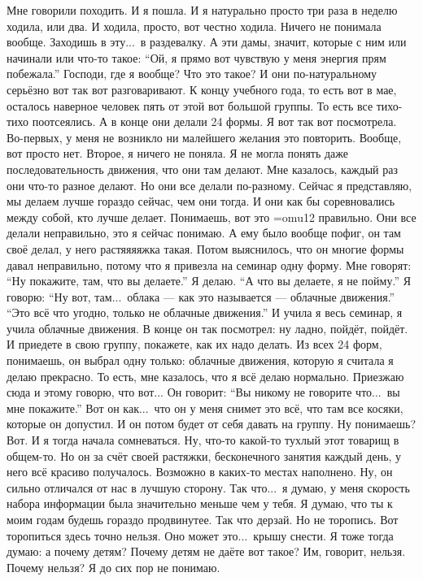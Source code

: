 Мне говорили походить.
И я пошла.
И я натурально просто три раза в неделю ходила, или два.
И ходила, просто, вот честно ходила.
Ничего не понимала вообще.
Заходишь в эту...\ в раздевалку.
А эти дамы, значит, которые с ним или начинали или что-то такое:
``Ой, я прямо вот чувствую у меня энергия прям побежала.''
Господи, где я вообще?
Что это такое?
И они по-натуральному серьёзно вот так вот разговаривают.
К концу учебного года, то есть вот в мае, осталось наверное человек пять от этой вот
большой группы.
То есть все тихо-тихо поотсеялись.
А в конце они делали 24 формы.
Я вот так вот посмотрела.
Во-первых, у меня не возникло ни малейшего желания это повторить.
Вообще, вот просто нет.
Второе, я ничего не поняла.
Я не могла понять даже последовательность движения, что они там делают.
Мне казалось, каждый раз они что-то разное делают.
Но они все делали по-разному.
Сейчас я представляю, мы делаем лучше гораздо сейчас, чем они тогда.
И они как бы соревновались между собой, кто лучше делает.
Понимаешь, вот это {\font\F=omu12 \F правильно}. Они все делали неправильно, это я сейчас понимаю.
А ему было вообще пофиг, он там своё делал, у него растяяяяжка такая.
Потом выяснилось, что он многие формы давал неправильно, потому что я привезла на семинар
одну форму.
Мне говорят: ``Ну покажите, там, что вы делаете.'' Я делаю.
``А что вы делаете, я не пойму.'' Я говорю: ``Ну вот, там...\ облака --- как это называется
--- облачные движения.''
``Это всё что угодно, только не облачные движения.''
И учила я весь семинар, я учила облачные движения.
В конце он так посмотрел: ну ладно, пойдёт, пойдёт.
И приедете в свою группу, покажете, как их надо делать.
Из всех 24 форм, понимаешь, он выбрал одну только: облачные движения, которую я считала
я делаю прекрасно.
То есть, мне казалось, что я всё делаю нормально.
Приезжаю сюда и этому говорю, что вот...
Он говорит: ``Вы никому не говорите что...\ вы мне покажите.'' Вот он как...\
что он у меня снимет это всё, что там все косяки, которые он допустил.
И он потом будет от себя давать на группу.
Ну понимаешь?
Вот. И я тогда начала сомневаться.
Ну, что-то какой-то тухлый этот товарищ в общем-то.
Но он за счёт своей растяжки, бесконечного занятия каждый день, у него всё красиво получалось.
Возможно в каких-то местах наполнено.
Ну, он сильно отличался от нас в лучшую сторону.
Так что...\ я думаю, у меня скорость набора информации была значительно меньше чем у тебя.
Я думаю, что ты к моим годам будешь гораздо продвинутее.
Так что дерзай.
Но не торопись.
Вот торопиться здесь точно нельзя.
Оно может это...\ крышу снести.
Я тоже тогда думаю: а почему детям?
Почему детям не даёте вот такое?
Им, говорит, нельзя.
Почему нельзя?
Я до сих пор не понимаю.

